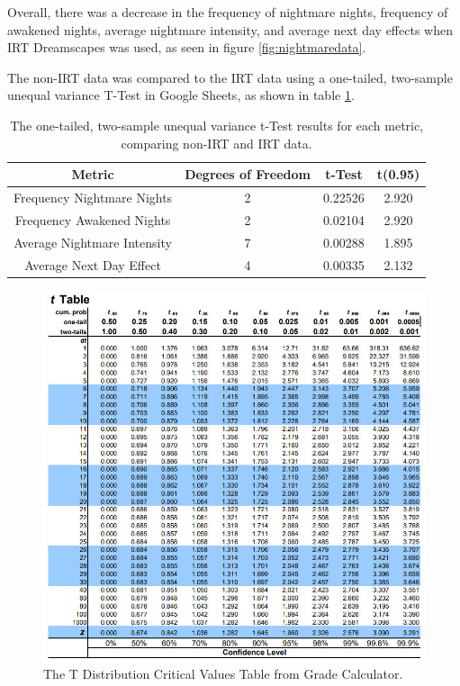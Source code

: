 \documentclass{article}
\begin{document}
Overall, there was a decrease in the frequency of nightmare nights, frequency of awakened nights, average nightmare intensity, and average next day effects when IRT Dreamscapes was used, as seen in figure \ref{fig:nightmaredata}.

The non-IRT data was compared to the IRT data using a one-tailed, two-sample unequal variance T-Test in Google Sheets, as shown in table \ref{NightmareStats}.

\begin{table}[htbp]
\centering
\begin{tabular}{||c c c c||}
 \hline
 Metric & Degrees of Freedom & t-Test & t(0.95) \\
 \hline
 Frequency Nightmare Nights & 2 & 0.22526 & 2.920 \\
 Frequency Awakened Nights & 2 & 0.02104 & 2.920 \\
 Average Nightmare Intensity & 7 & 0.00288 & 1.895 \\
 Average Next Day Effect & 4 & 0.00335 & 2.132 \\
 \hline
\end{tabular}
\caption{The one-tailed, two-sample unequal variance t-Test results for each metric, comparing non-IRT and IRT data.}
\label{NightmareStats}
\end{table}

\begin{figure}[htbp]
    \centering
    \includegraphics[width=1\textwidth]{images/t-table.jpg}
    \caption{The T Distribution Critical Values Table from Grade Calculator.}
    \label{fig:ttable}
\end{figure}
\end{document}
